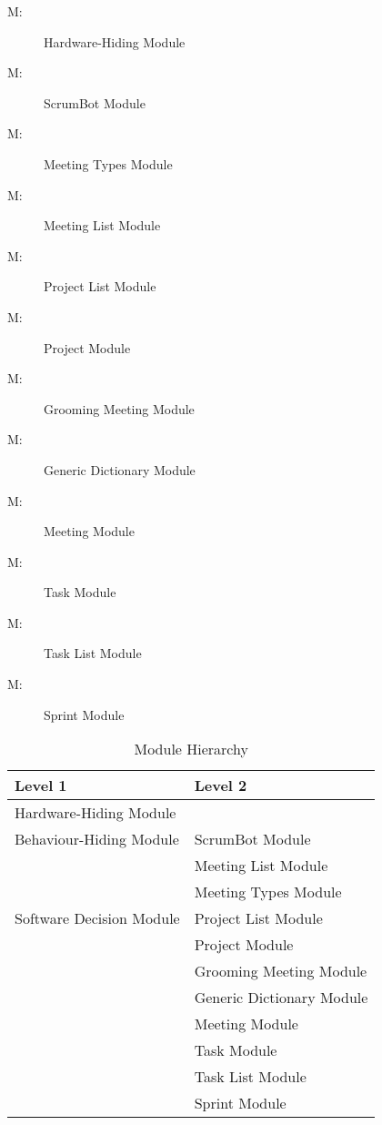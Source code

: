 \documentclass[12pt, titlepage]{article}
\newcounter{mnum}
\newcommand{\mthemnum}{M\themnum}
\begin{document}
\begin{description}
    \item [ \mthemnum \label{m1}:] Hardware-Hiding Module
    \item [ \mthemnum \label{m2}:] ScrumBot Module
    \item [ \mthemnum \label{m3}:] Meeting Types Module
    \item [ \mthemnum \label{m4}:] Meeting List Module
    \item [ \mthemnum \label{m5}:] Project List Module
    \item [ \mthemnum \label{m6}:] Project Module
    \item [ \mthemnum \label{m7}:] Grooming Meeting Module
    \item [ \mthemnum \label{m8}:] Generic Dictionary
    Module
    \item [ \mthemnum \label{m9}:] Meeting Module
    \item [ \mthemnum \label{m10}:] Task Module
    \item [ \mthemnum \label{m11}:] Task List Module
    \item [ \mthemnum \label{m12}:] Sprint Module
\end{description}


\begin{table}[h!]
\centering
\begin{tabular}{p{} p{}}
\toprule
\textbf{Level 1} & \textbf{Level 2}\\
\midrule

{Hardware-Hiding Module} & ~ \\
\midrule

\multirow{1}{0.3\textwidth}{Behaviour-Hiding Module} 
& ScrumBot Module\\ %
\midrule

\multirow{5}{0.3\textwidth}{Software Decision Module} 
& Meeting List Module\\         %
& Meeting Types Module\\        %
& Project List Module\\         %
& Project Module\\              %
& Grooming Meeting Module\\     %
& Generic Dictionary Module\\   %
& Meeting Module\\              %
& Task Module\\
& Task List Module\\
& Sprint Module\\
\bottomrule

\end{tabular}
\caption{Module Hierarchy}
\label{TblMH}
\end{table}
\end{document}

